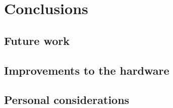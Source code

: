 
\chapter{Conclusions}\label{ch:conclusions}

	\section{Future work}
	
		\section{Improvements to the hardware}
			

	\section{Personal considerations}
